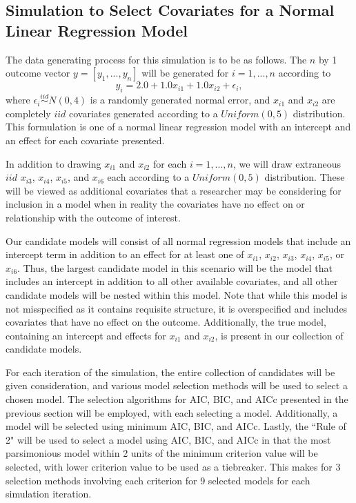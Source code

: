 		\subsection{Simulation to Select Covariates for a Normal Linear Regression Model}

		The data generating process for this simulation is to be as follows. The $n$ by 1 outcome vector $y = [y_1,...,y_n]$ will be generated for $i = 1,...,n$ according
		to
		\begin{equation*}
			y_i = 2.0 + 1.0 x_{i1} + 1.0 x_{i2} + \epsilon_i , 
		\end{equation*}
		where $\epsilon_i \stackrel{iid}{\sim} N(0,4)$ is a randomly generated normal error, and $x_{i1}$ and $x_{i2}$ are completely $iid$ covariates generated according to
		a $Uniform(0,5)$ distribution. This formulation is one of a normal linear regression model with an intercept and an effect for each covariate presented.

		In addition to drawing $x_{i1}$ and $x_{i2}$ for each $i=1,...,n$, we will draw extraneous $iid$ $x_{i3}$, $x_{i4}$, $x_{i5}$, and $x_{i6}$ each according to a
		$Uniform(0,5)$ distribution. These will be viewed as additional covariates that a researcher may be considering for inclusion in a model when in reality the covariates have
		no effect on or relationship with the outcome of interest.
		
		Our candidate models will consist of all normal regression models that include an intercept term in addition to an effect for at least one of 
		$x_{i1}$, $x_{i2}$, $x_{i3}$, $x_{i4}$, $x_{i5}$, or $x_{i6}$. Thus, the largest candidate model in this scenario will be the model that includes an intercept
		in addition to all other available covariates, and all other candidate models will be nested within this model. Note that while this model is not
		misspecified as it contains requisite structure, it is overspecified and includes covariates that have no effect on the outcome. Additionally, the
		true model, containing an intercept and effects for $x_{i1}$ and $x_{i2}$, is present in our collection of candidate models.

		For each iteration of the simulation, the entire collection of candidates will be given consideration, and various model selection methods will be
		used to select a chosen model. The selection algorithms for AIC, BIC, and AICc presented in the previous section will be employed, with each selecting a model.
		Additionally, a model will be selected using minimum AIC, BIC, and AICc. Lastly, the ``Rule of 2" will be used to select a model using AIC,
		BIC, and AICc in that the most parsimonious model within 2 units of the minimum criterion value will be selected, with lower criterion value to be used as a 
		tiebreaker. This makes for 3 selection methods involving each criterion for 9 selected models for each simulation iteration.

